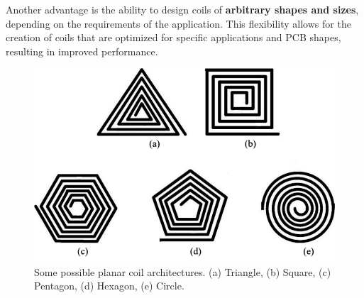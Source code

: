 \begin{samepage}
    Another advantage is the ability to design coils of \textbf{arbitrary shapes and sizes}, depending on the requirements of the application. This flexibility allows for the creation of coils that are optimized for specific applications and PCB shapes, resulting in improved performance.
    \nopagebreak

    \begin{figure}[th]
        \centering
        \includegraphics[width=0.5\columnwidth]{Chapters/Chapter2/PCB_coils/Figures/coils_shapes.png}
        \caption[Coils Shapes]{Some possible planar coil architectures. 
        (a) Triangle, (b) Square, (c) Pentagon, (d) Hexagon, (e) Circle.}
        \label{fig: Coils_shapes}
    \end{figure}
\end{samepage}